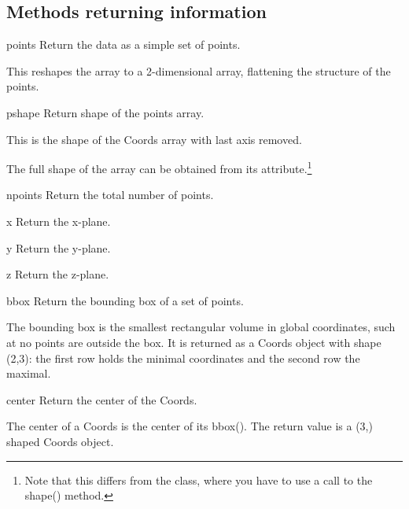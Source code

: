 \subsection{Methods returning information}

\begin{methoddesc}{points}{}
Return the data as a simple set of points.

This reshapes the array to a 2-dimensional array, flattening
the structure of the points.
\end{methoddesc}

    
\begin{methoddesc}{pshape}{}
Return shape of the points array.

This is the shape of the Coords array with last axis removed.

The full shape of the  array can be obtained from its  attribute.\footnote{Note that this differs from the  class, where you have to use a call to the shape() method.} 
\end{methoddesc}


\begin{methoddesc}{npoints}{}
Return the total number of points.
\end{methoddesc}
\begin{methoddesc}{x}{}
  Return the x-plane.
\end{methoddesc}
\begin{methoddesc}{y}{}
  Return the y-plane.
\end{methoddesc}
\begin{methoddesc}{z}{}
  Return the z-plane.
\end{methoddesc}

\begin{methoddesc}{bbox}{}
Return the bounding box of a set of points.

        The bounding box is the smallest rectangular volume in global
        coordinates, such at no points are outside the box.
        It is returned as a Coords object with shape (2,3): the first row
        holds the minimal coordinates and the second row the maximal.
\end{methoddesc}

\begin{methoddesc}{center}{}
Return the center of the Coords.

        The center of a Coords is the center of its bbox().
        The return value is a (3,) shaped Coords object.\end{methoddesc}

